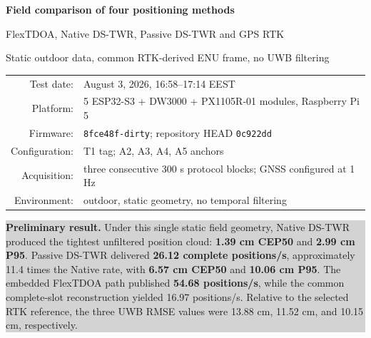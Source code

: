 \documentclass[11pt,a4paper]{article}
\newcommand{\native}{\textcolor{nativeblue}{Native DS-TWR}}
\newcommand{\passive}{\textcolor{passivepurple}{Passive DS-TWR}}
\newcommand{\flex}{\textcolor{flexorange}{FlexTDOA}}
\newcommand{\rtk}{\textcolor{rtkgreen}{GPS RTK}}
\begin{document}

\begin{titlepage}
  \centering
  \vspace*{14mm}
  {\Huge\bfseries Field comparison of four positioning methods\par}
  \vspace{4mm}
  {\Large \flex{}, \native{}, \passive{} and \rtk{}\par}
  \vspace{7mm}
  {\large Static outdoor data, common RTK-derived ENU frame, no UWB filtering\par}
  \vspace{15mm}

  \begin{tabular}{rl}
    Test date: & August 3, 2026, 16:58--17:14 EEST\\
    Platform: & 5 ESP32-S3 + DW3000 + PX1105R-01 modules, Raspberry Pi 5\\
    Firmware: & \texttt{8fce48f-dirty}; repository HEAD \texttt{0c922dd}\\
    Configuration: & T1 tag; A2, A3, A4, A5 anchors\\
    Acquisition: & three consecutive 300 s protocol blocks; GNSS configured at 1 Hz\\
    Environment: & outdoor, static geometry, no temporal filtering\\
  \end{tabular}

  \vfill
  \colorbox{lightgray}{%
    \begin{minipage}{0.89\textwidth}
      \vspace{3mm}
      \textbf{Preliminary result.}
      Under this single static field geometry, \native{} produced the tightest
      unfiltered position cloud: \textbf{1.39 cm CEP50} and
      \textbf{2.99 cm P95}. \passive{} delivered
      \textbf{26.12 complete positions/s}, approximately 11.4 times the Native
      rate, with \textbf{6.57 cm CEP50} and \textbf{10.06 cm P95}.
      The embedded \flex{} path published \textbf{54.68 positions/s}, while
      the common complete-slot reconstruction yielded 16.97 positions/s.
      Relative to the selected RTK reference, the three UWB RMSE values were
      13.88 cm, 11.52 cm, and 10.15 cm, respectively.
      \vspace{3mm}
    \end{minipage}}


\end{titlepage}
\end{document}
